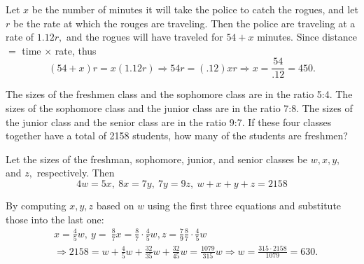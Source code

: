 \documentclass{article}
\begin{document}
\begin{soln}
    Let $x$ be the number of minutes it will take the police to catch the rogues, and let $r$ be the rate at which the rouges are traveling.
    Then the police are traveling at a rate of $1.12r,$ and the rogues will have traveled for $54+x$ minutes.
    Since distance $=$ time $\times$ rate, thus
    \[
        (54 + x)r = x (1.12r) \Rightarrow 54r = (.12)xr \Rightarrow x = \frac{54}{.12} = \boxed{450.}
    \]
\end{soln}

\begin{example}
    The sizes of the freshmen class and the sophomore class are in the ratio 5:4.
    The sizes of the sophomore class and the junior class are in the ratio 7:8.
    The sizes of the junior class and the senior class are in the ratio 9:7.
    If these four classes together have a total of 2158 students, how many of the students are freshmen?
\end{example}

\begin{soln}
    Let the sizes of the freshman, sophomore, junior, and senior classes be $w, x, y,$ and $z,$ respectively.
    Then
    \[
        4w = 5x,\ 8x = 7y,\ 7y= 9z,\ w+x+y+z = 2158
    \]

    By computing $x, y, z$ based on $w$ using the first three equations and substitute those into the last one:
    \[
        \begin{aligned}
            &x = \frac{4}{5}w,\ y=\ \frac{8}{7}x = \frac{8}{7} \cdot \frac{4}{5}w , z = \frac{7}{9} \frac{8}{7} \cdot \frac{4}{5}w\\
            &\Rightarrow 2158 = w + \frac{4}{5}w + \frac{32}{35}w + \frac{32}{45}w = \frac{1079}{315} w 
            \Rightarrow w = \frac{315 \cdot 2158}{1079} = \boxed{630.}
        \end{aligned}
    \]
\end{soln}
\end{document}
